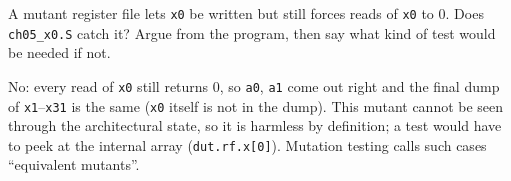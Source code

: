 \begin{exercise}[hard]\label{ex:h05e}
A mutant register file lets \texttt{x0} be written but still forces
reads of \texttt{x0} to 0. Does \texttt{ch05\_x0.S} catch it? Argue
from the program, then say what kind of test would be needed if not.
\end{exercise}
\begin{solution}[hint]
No: every read of \texttt{x0} still returns 0, so \texttt{a0}, \texttt{a1}
come out right and the final dump of \texttt{x1}--\texttt{x31} is the
same (\texttt{x0} itself is not in the dump). This mutant cannot be
seen through the architectural state, so it is harmless by definition;
a test would have to peek at the internal array (\texttt{dut.rf.x[0]}).
Mutation testing calls such cases ``equivalent mutants''.
\end{solution}

\emergencystretch=0pt
